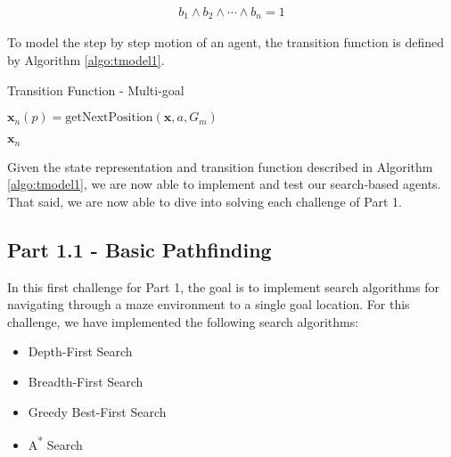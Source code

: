 \documentclass{article}[12pt]
\begin{document}
   \begin{align*}
   b_1 \wedge b_2 \wedge \cdots \wedge b_n = 1
   \end{align*}
   
   To model the step by step motion of an agent, the transition function is defined by Algorithm \ref{algo:tmodel1}.
   
	\begin{algorithm}[H]
	\caption{Transition Function - Multi-goal }
		 \;
		 
		 \;
		 
		 $\boldsymbol{x}_n(p) = \text{getNextPosition}\left(\boldsymbol{x},a,G_m\right)$
		 \;
		 \;
		 
		 \;
		 \Return $\boldsymbol{x}_n$
		 \label{algo:tmodel1}
	\end{algorithm}
	
	Given the state representation and transition function described in Algorithm \ref{algo:tmodel1}, we are now able to implement and test our search-based agents. That said, we are now able to dive into solving each challenge of Part 1.
	
	\subsection{Part 1.1 - Basic Pathfinding}
   In this first challenge for Part 1, the goal is to implement search algorithms for navigating through a maze environment to a single goal location. For this challenge, we have implemented the following search algorithms:
   
   \begin{itemize}
   \item Depth-First Search
   \item Breadth-First Search
   \item Greedy Best-First Search
   \item A\textsuperscript{*} Search
   \end{itemize}
   
\end{document}
